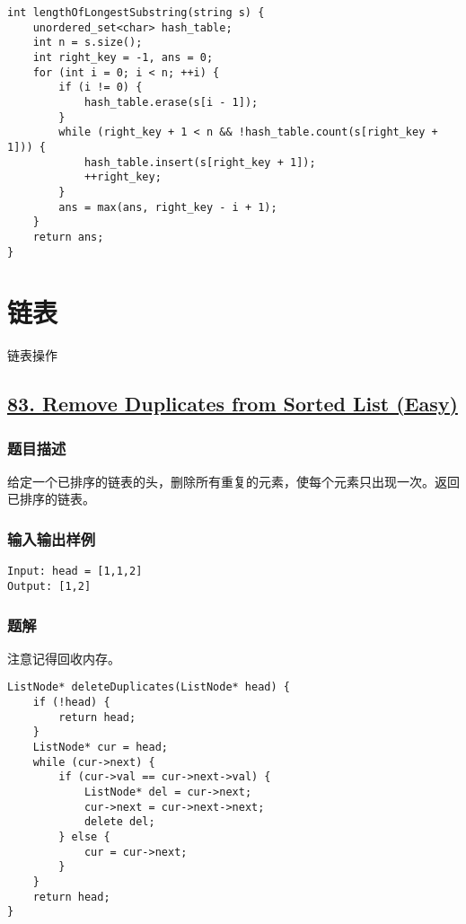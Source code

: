 \documentclass[lang=cn,10pt]{elegantbook}
\begin{document}
\begin{lstlisting}
int lengthOfLongestSubstring(string s) {
	unordered_set<char> hash_table;
	int n = s.size();
	int right_key = -1, ans = 0;
	for (int i = 0; i < n; ++i) {
		if (i != 0) {
			hash_table.erase(s[i - 1]);
		}
		while (right_key + 1 < n && !hash_table.count(s[right_key + 1])) {
			hash_table.insert(s[right_key + 1]);
			++right_key;
		}
		ans = max(ans, right_key - i + 1);
	}
	return ans;
}
\end{lstlisting}

\chapter{链表}

\begin{introduction}[前情提要]
	\item 链表操作
\end{introduction}

{\color{red}\section{\href{https://leetcode.cn/problems/remove-duplicates-from-sorted-list/}{83. Remove Duplicates from Sorted List (Easy)}}} \label{ch13.83}

\subsection*{题目描述}

给定一个已排序的链表的头，删除所有重复的元素，使每个元素只出现一次。返回已排序的链表。

\subsection*{输入输出样例}

\begin{lstlisting}
Input: head = [1,1,2]
Output: [1,2]
\end{lstlisting}

\subsection*{题解}

注意记得回收内存。

\begin{lstlisting}
ListNode* deleteDuplicates(ListNode* head) {
	if (!head) {
		return head;
	}
	ListNode* cur = head;
	while (cur->next) {
		if (cur->val == cur->next->val) {
			ListNode* del = cur->next;
			cur->next = cur->next->next;
			delete del;
		} else {
			cur = cur->next;
		}
	}
	return head;
}
\end{lstlisting}
\end{document}
